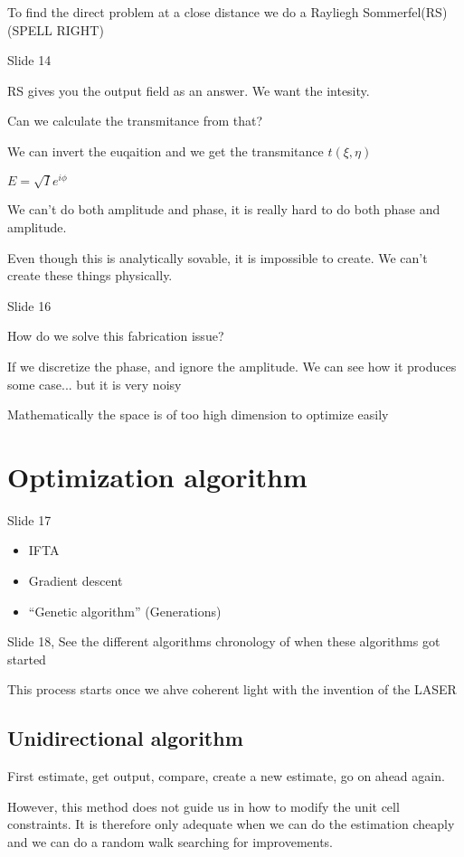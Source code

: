 \documentclass[../main/main.tex]{subfiles}
\begin{document}
To find the direct problem at a close distance we do a Rayliegh Sommerfel(RS) (SPELL RIGHT)

Slide 14

RS  gives you the output field as an answer. We want the intesity.

Can we calculate the transmitance from that?

We can invert the euqaition and we get the transmitance $t(\xi, \eta)$

$E = \sqrt{I} e^{i \phi}$

We can't do both amplitude and phase, it is really hard to do both phase and amplitude.

Even though this is analytically sovable, it is impossible to create. We can't create these things physically.

Slide 16

How do we solve this fabrication issue?

If we discretize the phase, and ignore the amplitude. We can see how it produces some case... but it is very noisy

Mathematically the space is of too high dimension to optimize easily

\section{Optimization algorithm}
Slide 17

\begin{itemize}
	\item IFTA
	\item Gradient descent
	\item ``Genetic algorithm'' (Generations)
\end{itemize}

Slide 18, See the different algorithms chronology of when these algorithms got started

This process starts once we ahve coherent light with the invention of the LASER


\subsection{Unidirectional algorithm}

First estimate, get output, compare, create a new estimate, go on ahead again.

However, this method does not guide us in how to modify the unit cell constraints. It is therefore only adequate when we can do the estimation cheaply and we can do a random walk searching for improvements.
\end{document}
